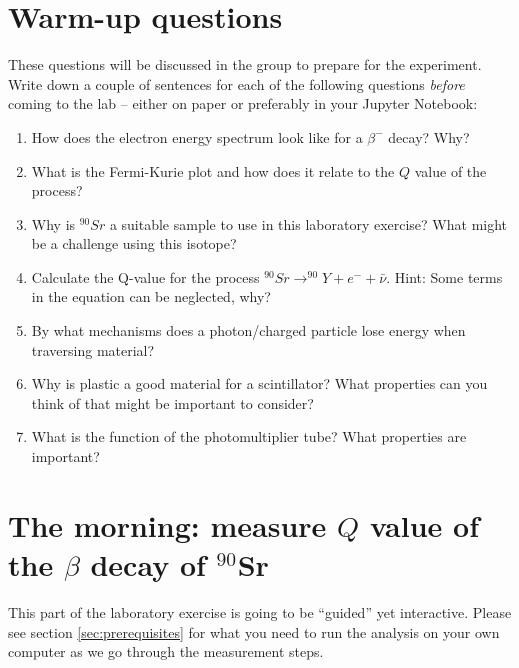 \documentclass[a4,11pt, notitlepage]{article}
\begin{document}
\section{Warm-up questions}
\label{sec:warm-up-questions}

These questions will be discussed in the group to prepare for the experiment.
Write down a couple of sentences for each of the following questions
\emph{before} coming to the lab -- either on paper or preferably in your Jupyter
Notebook:

\begin{enumerate}
\item How does the electron energy spectrum look like for a $\beta^-$ decay?
  Why?
\item What is the Fermi-Kurie plot and how does it relate to the $Q$ value of
  the process?
\item Why is $^{90}Sr$ a suitable sample to use in this laboratory exercise?
  What might be a challenge using this isotope?
\item Calculate the Q-value for the process $^{90}Sr\rightarrow ^{90}Y + e^- +
  \bar{\nu}$. Hint: Some terms in the equation can be neglected, why? 
\item By what mechanisms does a photon/charged particle lose energy
  when traversing material?
\item Why is plastic a good material for a scintillator? What
  properties can you think of that might be important to consider?
\item What is the function of the photomultiplier tube? What properties are important?
\end{enumerate}


\section{The morning: measure $Q$ value of the $\beta$ decay of $^{90}$Sr}
This part of the laboratory exercise is going to be ``guided'' yet
interactive. Please see section \ref{sec:prerequisites} for what you
need to run the analysis on your own computer as we go through the measurement steps.
\end{document}
